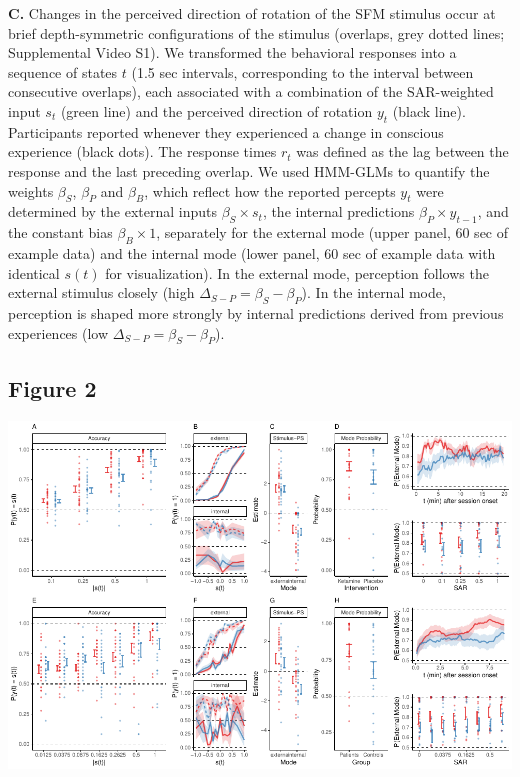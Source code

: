\documentclass[
]{article}
\begin{document}
\textbf{C.} Changes in the perceived direction of rotation of the SFM
stimulus occur at brief depth-symmetric configurations of the stimulus
(overlaps, grey dotted lines; Supplemental Video S1). We transformed the
behavioral responses into a sequence of states \(t\) (1.5 sec intervals,
corresponding to the interval between consecutive overlaps), each
associated with a combination of the SAR-weighted input \(s_t\) (green
line) and the perceived direction of rotation \(y_t\) (black line).
Participants reported whenever they experienced a change in conscious
experience (black dots). The response times \(r_t\) was defined as the
lag between the response and the last preceding overlap. We used
HMM-GLMs to quantify the weights \(\beta_S\), \(\beta_P\) and
\(\beta_B\), which reflect how the reported percepts \(y_t\) were
determined by the external inputs \(\beta_S \times s_t\), the internal
predictions \(\beta_P \times y_{t-1}\), and the constant bias
\(\beta_B \times 1\), separately for the external mode (upper panel, 60
sec of example data) and the internal mode (lower panel, 60 sec of
example data with identical \(s(t)\) for visualization). In the external
mode, perception follows the external stimulus closely (high
\(\Delta_{S-P} = \beta_S - \beta_P\)). In the internal mode, perception
is shaped more strongly by internal predictions derived from previous
experiences (low \(\Delta_{S-P} = \beta_S - \beta_P\)).

\newpage

\subsection{Figure 2}\label{figure-2}

\includegraphics{modes_ketamine_scz_files/figure-latex/Figure_2-1.pdf}
\end{document}
